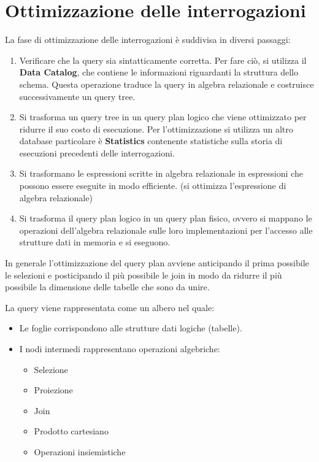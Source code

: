 \section{Ottimizzazione delle interrogazioni}
La fase di ottimizzazione delle interrogazioni è suddivisa in diversi passaggi:
\begin{enumerate}
      \item Verificare che la query sia sintatticamente corretta. Per fare ciò,
            si utilizza il \textbf{Data Catalog}, che contiene le informazioni
            riguardanti la struttura dello schema.
            Questa operazione traduce la query in algebra relazionale e costruisce
            successivamente un query tree.
      \item Si trasforma un query tree in un query plan logico che viene ottimizzato
            per ridurre il suo costo di esecuzione. Per l'ottimizzazione si
            utilizza un altro database particolare è \textbf{Statistics}
            contenente statistiche sulla storia di esecuzioni precedenti delle
            interrogazioni.
      \item Si trasformano le espressioni scritte in algebra relazionale in
            espressioni che possono essere eseguite in modo efficiente. (si
            ottimizza l'espressione di algebra relazionale)
      \item Si trasforma il query plan logico in un query plan fisico, ovvero
            si mappano le operazioni dell'algebra relazionale sulle loro
            implementazioni per l'accesso alle strutture dati in memoria e si eseguono.
\end{enumerate}
\begin{nota}
      In generale l'ottimizzazione del query plan avviene anticipando il prima possibile
      le selezioni e posticipando il più possibile le join in modo da ridurre il più
      possibile la dimensione delle tabelle che sono da unire.
\end{nota}
\begin{definizione}
      La query viene rappresentata come un albero nel quale:
      \begin{itemize}
            \item Le foglie corrispondono alle strutture dati logiche (tabelle).
            \item I nodi intermedi rappresentano operazioni algebriche:
                  \begin{itemize}
                        \item Selezione
                        \item Proiezione
                        \item Join
                        \item Prodotto cartesiano
                        \item Operazioni insiemistiche
                  \end{itemize}
      \end{itemize}
\end{definizione}
